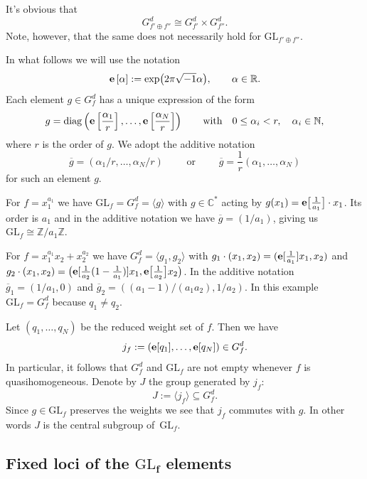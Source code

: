 \documentclass[10pt,a4paper]{amsart}
\numberwithin{equation}{section}
\newcommand{\CC}{{\mathbb{C}}}
\newcommand{\RR}{{\mathbb{R}}}
\newcommand{\ZZ}{{\mathbb{Z}}}
\newcommand{\NN}{{\mathbb{N}}}
\newcommand{\GL}{{\mathrm{GL}}}
\newcommand{\epi}{{\bf e}}
\begin{document}
It's obvious that
\begin{equation}\label{eq: full symmetry group of oplus}
	G_{f' \oplus f''}^d \cong G_{f'}^d \times G_{f''}^d.
\end{equation}
Note, however, that the same does not necessarily hold for $\GL_{f' \oplus f''}$.

In what follows we will use the notation
\[
\epi\left[\alpha\right] := \exp\bigl(2 \pi \sqrt{-1} \alpha\bigr), \qquad \alpha \in \RR.
\]
Each element $g\in G_f^d$ has a unique expression of the form
\begin{equation*}%
g={\rm diag}\left(\epi\left[\frac{\alpha_1}{r}\right], \dots,\epi\left[\frac{\alpha_N}{r}\right]\right)
\qquad \mbox{with}\quad 0 \leq \alpha_i < r,\quad \alpha_i\in\NN,
\end{equation*}
where $r$ is the order of $g$. We adopt the additive notation
\[
{\overline g = (\alpha_1/r,\dots, \alpha_N/r)} \qquad \text{ or } \qquad
{\overline g = \frac{1}{r}(\alpha_1,\dots, \alpha_N) }
\]
for such an element $g$.

\begin{Example}
For $f = x_1^{a_1}$	we have $\GL_f = G_f^d = \langle g \rangle $ with $g \in \CC^\ast$ acting by $g(x_1) = \epi\bigl[\frac{1}{a_1}\bigr] \cdot x_1$. Its order is $a_1$ and in the additive notation we have $\overline g = (1/a_1)$, giving us $\GL_f \cong \ZZ / a_1 \ZZ$.
\end{Example}
\begin{Example}\label{example: symmetry group chain2}
For $f = x_1^{a_1}x_2 + x_2^{a_2}$ we have $G_f^d = \langle g_1, g_2 \rangle$ with $g_1 \cdot (x_1,x_2) = (\epi[\frac{1}{a_1}] x_1, x_2)$ and ${ g_2 \cdot (x_1,x_2) = \bigl(\epi[\frac{1}{a_2}(1 - \frac{1}{a_1})]x_1, \epi\bigl[\frac{1}{a_2}\bigr]x_2\bigr)}$. In the additive notation $\overline g_1 = (1/a_1, 0)$ and $\overline g_2 = ((a_1 - 1)/(a_1a_2), 1/a_2)$.
In this example $\GL_f = G_f^d$ because $q_1 \neq q_2$.
\end{Example}

Let $(q_1,\dots,q_N)$ be the reduced weight set of $f$. Then we have
\[
	j_f:= (\epi[q_1],\dots, \epi[q_N]) \in G_f^d.
\]
In particular, it follows that $G_f^d$ and $\GL_f$ are not empty whenever $f$ is quasihomogeneous.
Denote by $J$ the group generated by $j_f$:
\[
	J := \langle j_f \rangle \subseteq G_f^d.
\]
Since $g\in \GL_f$ preserves the weights we see that $j_f$ commutes with $g$. In other words $J$ is the central subgroup of~$\GL_f$.

\subsection[Fixed loci of the GL\_f elements]{Fixed loci of the $\boldsymbol{\GL_f}$ elements}
\end{document}
